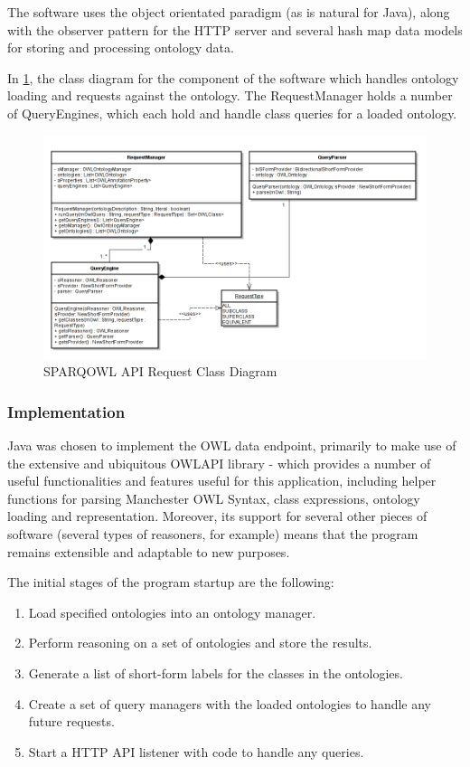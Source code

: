 \documentclass{article}
\begin{document}
The software uses the object orientated paradigm (as is natural for Java), along
with the observer pattern for the HTTP server and several hash map data models
for storing and processing ontology data.

In \ref{fig:requestclass}, the class diagram for the component of the software
which handles ontology loading and requests against the ontology. The
RequestManager holds a number of QueryEngines, which each hold and handle class
queries for a loaded ontology.

\begin{figure}[h!]
  \centering
  \includegraphics[width=\textwidth]{sparqowlapi.png}
  \caption{SPARQOWL API Request Class Diagram}
  \label{fig:requestclass}
\end{figure}

\subsubsection{Implementation}

Java was chosen to implement the OWL data endpoint, primarily to make use of the
extensive and ubiquitous OWLAPI library - which provides a number of useful
functionalities and features useful for this application, including helper
functions for parsing Manchester OWL Syntax, class expressions, ontology loading
and representation. Moreover, its support for several other pieces of software
(several types of reasoners, for example) means that the program remains
extensible and adaptable to new purposes.

The initial stages of the program startup are the following:

\begin{enumerate}
    \item Load specified ontologies into an ontology manager. 
    \item Perform reasoning on a set of ontologies and store the results.
    \item Generate a list of short-form labels for the classes in the
    ontologies.
    \item Create a set of query managers with the loaded ontologies to handle
    any future requests.
    \item Start a HTTP API listener with code to handle any queries.
\end{enumerate}
\end{document}
